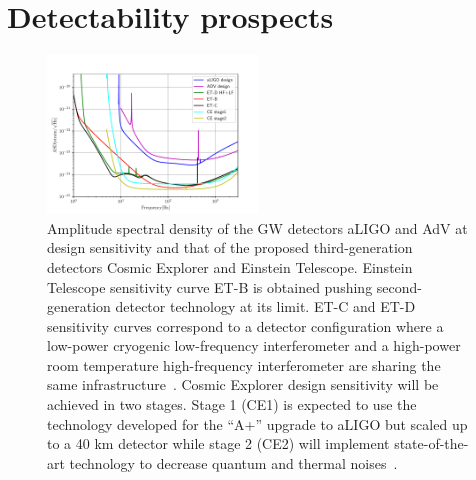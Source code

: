 \section{Detectability prospects}
\label{sec:results}

\begin{figure}[t]
 \centering
 \includegraphics[width=0.5\textwidth]{plots/spectrum}
 \caption{Amplitude spectral density of the GW detectors aLIGO and AdV at design sensitivity and that of the proposed third-generation detectors Cosmic Explorer and Einstein Telescope. Einstein Telescope sensitivity curve ET-B is obtained pushing second-generation detector technology at its limit. ET-C and ET-D sensitivity curves correspond to a detector configuration where a low-power cryogenic low-frequency interferometer and a high-power room temperature high-frequency interferometer are sharing the same infrastructure~\cite{Hild_2011}. Cosmic Explorer design sensitivity will be achieved in two stages. Stage 1 (CE1) is expected to use the technology developed for the ``A+'' upgrade to aLIGO but scaled up to a 40 km detector while stage 2 (CE2) will implement state-of-the-art technology to decrease quantum and thermal noises~\cite{reitze2019cosmic}. } 
 \label{fig:spectrum}
\end{figure}

